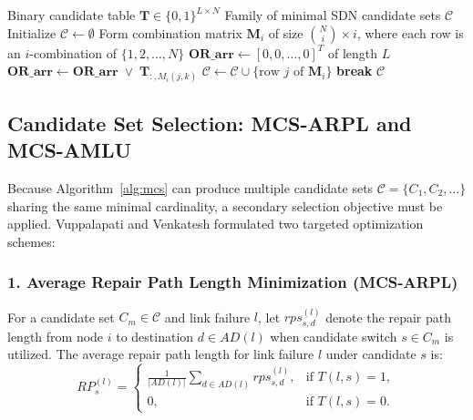 \begin{algorithm}[htbp]
\caption{Minimum Candidate Selection (MCS) Algorithm \cite{vuppalapati2022minimum}}
\label{alg:mcs}
\begin{algorithmic}[1]
\Require Binary candidate table $\mathbf{T} \in \{0, 1\}^{L \times N}$
\Ensure Family of minimal SDN candidate sets $\mathcal{C}$
\State Initialize $\mathcal{C} \gets \emptyset$
    \State Form combination matrix $\mathbf{M}_i$ of size $\binom{N}{i} \times i$, where each row is an $i$-combination of $\{1, 2, \dots, N\}$
        \State $\mathbf{OR\_arr} \gets [0, 0, \dots, 0]^T$ of length $L$
            \State $\mathbf{OR\_arr} \gets \mathbf{OR\_arr} \;\lor\; \mathbf{T}_{:, M_i(j, k)}$ 
        \EndFor
            \State $\mathcal{C} \gets \mathcal{C} \cup \{\text{row } j \text{ of } \mathbf{M}_i\}$
        \EndIf
    \EndFor
        \State \textbf{break} 
    \EndIf
\EndFor
\State \Return $\mathcal{C}$
\end{algorithmic}
\end{algorithm}

\subsection{Candidate Set Selection: MCS-ARPL and MCS-AMLU}
Because Algorithm~\ref{alg:mcs} can produce multiple candidate sets $\mathcal{C} = \{C_1, C_2, \dots\}$ sharing the same minimal cardinality, a secondary selection objective must be applied. Vuppalapati and Venkatesh formulated two targeted optimization schemes:

\subsubsection{1. Average Repair Path Length Minimization (MCS-ARPL)}
For a candidate set $C_m \in \mathcal{C}$ and link failure $l$, let $rps_{s, d}^{(l)}$ denote the repair path length from node $i$ to destination $d \in AD(l)$ when candidate switch $s \in C_m$ is utilized. The average repair path length for link failure $l$ under candidate $s$ is:
\begin{equation}
    RP_s^{(l)} = \begin{cases}
        \frac{1}{|AD(l)|} \sum_{d \in AD(l)} rps_{s, d}^{(l)}, & \text{if } T(l, s) = 1, \\
        0, & \text{if } T(l, s) = 0.
    \end{cases}
\end{equation}

